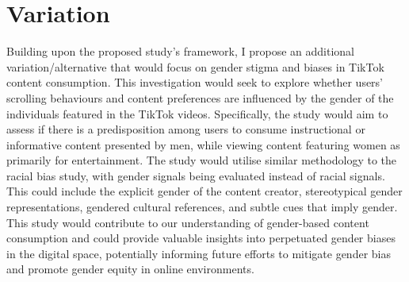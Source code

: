 \documentclass[a4paper, 12pt]{article}   %
\begin{document}
\section*{Variation}
Building upon the proposed study’s framework, I propose an additional variation/alternative that would focus on gender stigma and biases in TikTok content consumption. This investigation would seek to explore whether users' scrolling behaviours and content preferences are influenced by the gender of the individuals featured in the TikTok videos. Specifically, the study would aim to assess if there is a predisposition among users to consume instructional or informative content presented by men, while viewing content featuring women as primarily for entertainment. The study would utilise similar methodology to the racial bias study, with gender signals being evaluated instead of racial signals. This could include the explicit gender of the content creator, stereotypical gender representations, gendered cultural references, and subtle cues that imply gender. This study would contribute to our understanding of gender-based content consumption and could provide valuable insights into perpetuated gender biases in the digital space, potentially informing future efforts to mitigate gender bias and promote gender equity in online environments.

\printbibliography
\end{document}
